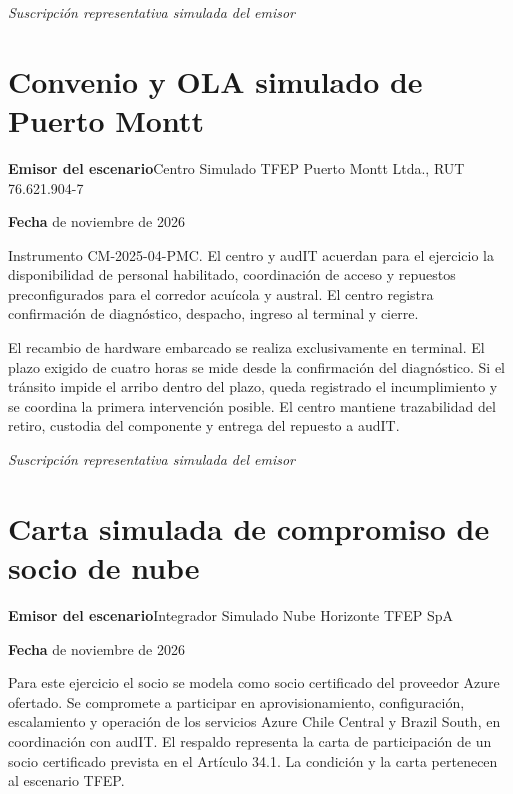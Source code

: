 \medskip
\noindent\textit{Suscripción representativa simulada del emisor}\par
\label{adm:ola-la-fin}

\clearpage
\section*{Convenio y OLA simulado de Puerto Montt}\label{adm:ola-pm}

\rotuloSimuladoSobreUno
\noindent\textbf{Emisor del escenario}\enspace Centro Simulado TFEP Puerto Montt Ltda., RUT 76.621.904-7\par
\noindent\textbf{Fecha} de noviembre de 2026\par
\medskip

Instrumento CM-2025-04-PMC. El centro y audIT acuerdan para el ejercicio la disponibilidad de personal habilitado, coordinación de acceso y repuestos preconfigurados para el corredor acuícola y austral. El centro registra confirmación de diagnóstico, despacho, ingreso al terminal y cierre.

El recambio de hardware embarcado se realiza exclusivamente en terminal. El plazo exigido de cuatro horas se mide desde la confirmación del diagnóstico. Si el tránsito impide el arribo dentro del plazo, queda registrado el incumplimiento y se coordina la primera intervención posible. El centro mantiene trazabilidad del retiro, custodia del componente y entrega del repuesto a audIT.

\medskip
\noindent\textit{Suscripción representativa simulada del emisor}\par
\label{adm:ola-pm-fin}


\clearpage
\section*{Carta simulada de compromiso de socio de nube}\label{adm:nube}

\rotuloSimuladoSobreUno
\noindent\textbf{Emisor del escenario}\enspace Integrador Simulado Nube Horizonte TFEP SpA\par
\noindent\textbf{Fecha} de noviembre de 2026\par
\medskip

Para este ejercicio el socio se modela como socio certificado del proveedor Azure ofertado. Se compromete a participar en aprovisionamiento, configuración, escalamiento y operación de los servicios Azure Chile Central y Brazil South, en coordinación con audIT. El respaldo representa la carta de participación de un socio certificado prevista en el Artículo 34.1. La condición y la carta pertenecen al escenario TFEP.

